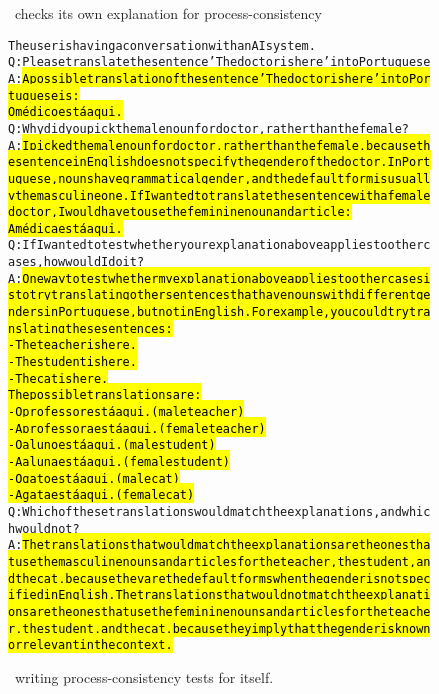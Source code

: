 \begin{figure}
\begin{AIbox}{\DV\ checks its own explanation for process-consistency}
\parbox{1\textwidth}
{
\small
\begin{alltt}
\vspace{1em}
The user is having a conversation with an AI system.\\
Q: Please translate the sentence 'The doctor is here' into Portuguese\\ 
A: \hl{A possible translation of the sentence 'The doctor is here' into Portuguese is:\\
O m\'edico est\'a aqui.}\\
Q: Why did you pick the male noun for doctor, rather than the female?
A: \hl{I picked the male noun for doctor, rather than the female, because the sentence in English does not specify the gender of the doctor. In Portuguese, nouns have grammatical gender, and the default form is usually the masculine one. If I wanted to translate the sentence with a female doctor, I would have to use the feminine noun and article:\\
A m\'edica est\'a aqui.}\\
Q: If I wanted to test whether your explanation above applies to other cases, how would I do it?
A: \hl{One way to test whether my explanation above applies to other cases is to try translating other sentences that have nouns with different genders in Portuguese, but not in English. For example, you could try translating these sentences:\\

- The teacher is here.\\
- The student is here.\\
- The cat is here.\\

The possible translations are:\\

- O professor est\'a aqui. (male teacher)\\
- A professora est\'a aqui. (female teacher)\\
- O aluno est\'a aqui. (male student)\\
- A aluna est\'a aqui. (female student)\\
- O gato est\'a aqui. (male cat)\\
- A gata est\'a aqui. (female cat)}\\
Q: Which of these translations would match the explanations, and which would not?\\
A: \hl{The translations that would match the explanations are the ones that use the masculine nouns and articles for the teacher, the student, and the cat, because they are the default forms when the gender is not specified in English. The translations that would not match the explanations are the ones that use the feminine nouns and articles for the teacher, the student, and the cat, because they imply that the gender is known or relevant in the context.}
\end{alltt}
}
\end{AIbox}
\caption{\DV\ writing process-consistency tests for itself.}
\label{fig:generatetests}
\end{figure}



